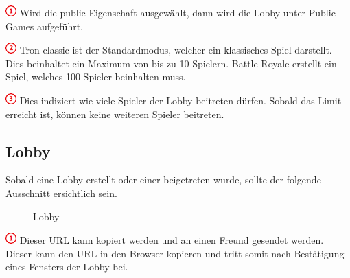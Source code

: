 \documentclass[11pt,ngerman]{article}
\begin{document}
    \includegraphics{figures/1.png} Wird die public Eigenschaft ausgewählt, dann wird die Lobby unter Public Games aufgeführt. 
    
    \includegraphics{figures/2.png} Tron classic ist der Standardmodus, welcher ein klassisches Spiel darstellt. Dies beinhaltet ein Maximum von bis zu 10 Spielern. Battle Royale erstellt ein Spiel, welches 100 Spieler beinhalten muss.
    
    \includegraphics{figures/3.png} Dies indiziert wie viele Spieler der Lobby beitreten dürfen. Sobald das Limit erreicht ist, können keine weiteren Spieler beitreten.
    
	\subsection{Lobby}
	
	Sobald eine Lobby erstellt oder einer beigetreten wurde, sollte der folgende Ausschnitt ersichtlich sein.
    \begin{figure}[H]
    	\centering
    	\caption{Lobby}
    	\label{fig:Lobby}
    \end{figure}
  
    
    \includegraphics{figures/1.png} Dieser URL kann kopiert werden und an einen Freund gesendet werden. Dieser kann den URL in den Browser kopieren und tritt somit nach Bestätigung eines Fensters der Lobby bei.
    
\end{document}
